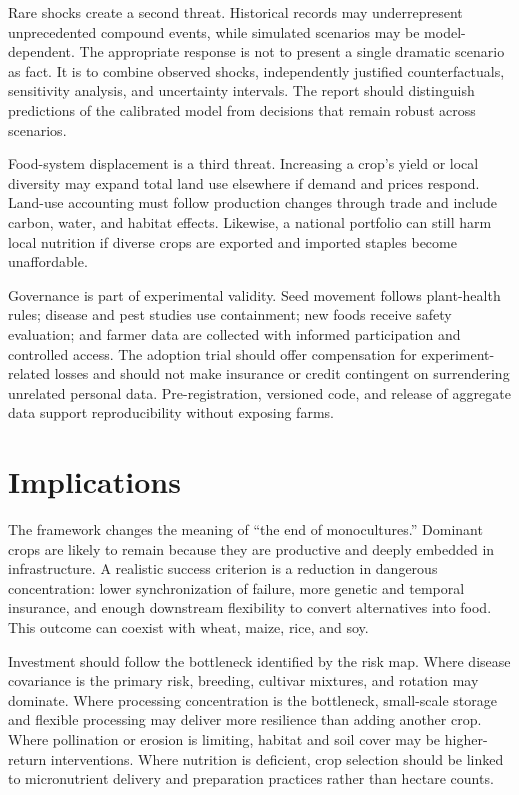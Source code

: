 \documentclass[conference]{IEEEtran}
\begin{document}
Rare shocks create a second threat. Historical records may underrepresent unprecedented compound events, while simulated scenarios may be model-dependent. The appropriate response is not to present a single dramatic scenario as fact. It is to combine observed shocks, independently justified counterfactuals, sensitivity analysis, and uncertainty intervals. The report should distinguish predictions of the calibrated model from decisions that remain robust across scenarios.

Food-system displacement is a third threat. Increasing a crop's yield or local diversity may expand total land use elsewhere if demand and prices respond. Land-use accounting must follow production changes through trade and include carbon, water, and habitat effects. Likewise, a national portfolio can still harm local nutrition if diverse crops are exported and imported staples become unaffordable.

Governance is part of experimental validity. Seed movement follows plant-health rules; disease and pest studies use containment; new foods receive safety evaluation; and farmer data are collected with informed participation and controlled access. The adoption trial should offer compensation for experiment-related losses and should not make insurance or credit contingent on surrendering unrelated personal data. Pre-registration, versioned code, and release of aggregate data support reproducibility without exposing farms.

\section{Implications}
\label{sec:implications}
The framework changes the meaning of ``the end of monocultures.'' Dominant crops are likely to remain because they are productive and deeply embedded in infrastructure. A realistic success criterion is a reduction in dangerous concentration: lower synchronization of failure, more genetic and temporal insurance, and enough downstream flexibility to convert alternatives into food. This outcome can coexist with wheat, maize, rice, and soy.

Investment should follow the bottleneck identified by the risk map. Where disease covariance is the primary risk, breeding, cultivar mixtures, and rotation may dominate. Where processing concentration is the bottleneck, small-scale storage and flexible processing may deliver more resilience than adding another crop. Where pollination or erosion is limiting, habitat and soil cover may be higher-return interventions. Where nutrition is deficient, crop selection should be linked to micronutrient delivery and preparation practices rather than hectare counts.
\end{document}
